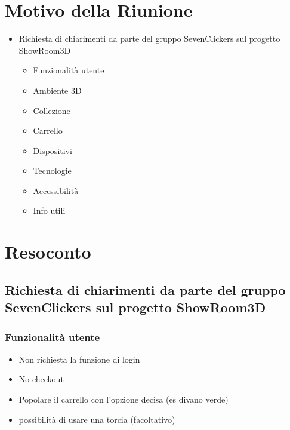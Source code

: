 \section{Motivo della Riunione}
\begin{itemize}
    \item Richiesta di chiarimenti da parte del gruppo SevenClickers sul progetto ShowRoom3D
    \begin{itemize}
        \item Funzionalità utente
        \item Ambiente 3D
        \item Collezione
        \item Carrello
        \item Dispositivi
        \item Tecnologie
        \item Accessibilità
        \item Info utili
    \end{itemize}
\end{itemize}
\section{Resoconto}
\subsection{Richiesta di chiarimenti da parte del gruppo SevenClickers sul progetto ShowRoom3D}
\subsubsection{Funzionalità utente}
\begin{itemize}
    \item Non richiesta la funzione di login
    \item No checkout
    \item Popolare il carrello con l’opzione decisa (es divano verde)
    \item possibilità di usare una torcia (facoltativo)
\end{itemize}

